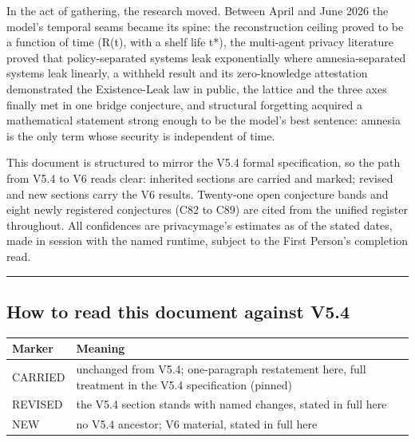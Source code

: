 \documentclass[
]{article}
\newcounter{none} %
\begin{document}
In the act of gathering, the research moved. Between April and June 2026
the model's temporal seams became its spine: the reconstruction ceiling
proved to be a function of time (R(t), with a shelf life t*), the
multi-agent privacy literature proved that policy-separated systems leak
exponentially where amnesia-separated systems leak linearly, a withheld
result and its zero-knowledge attestation demonstrated the
Existence-Leak law in public, the lattice and the three axes finally met
in one bridge conjecture, and structural forgetting acquired a
mathematical statement strong enough to be the model's best sentence:
amnesia is the only term whose security is independent of time.

This document is structured to mirror the V5.4 formal specification, so
the path from V5.4 to V6 reads clear: inherited sections are carried and
marked; revised and new sections carry the V6 results. Twenty-one open
conjecture bands and eight newly registered conjectures (C82 to C89) are
cited from the unified register throughout. All confidences are
privacymage's estimates as of the stated dates, made in session with the
named runtime, subject to the First Person's completion read.

\begin{center}\rule{0.5\linewidth}{0.5pt}\end{center}

\subsection{How to read this document against
V5.4}\label{how-to-read-this-document-against-v5.4}

{\def\LTcaptype{none} %
\begin{longtable}[]{@{}
  >{\raggedright\arraybackslash}p{}
  >{\raggedright\arraybackslash}p{}@{}}
\toprule\noalign{}
\begin{minipage}[b]{\linewidth}\raggedright
Marker
\end{minipage} & \begin{minipage}[b]{\linewidth}\raggedright
Meaning
\end{minipage} \\
\midrule\noalign{}
\endhead
\bottomrule\noalign{}
\endlastfoot
CARRIED & unchanged from V5.4; one-paragraph restatement here, full
treatment in the V5.4 specification (pinned) \\
REVISED & the V5.4 section stands with named changes, stated in full
here \\
NEW & no V5.4 ancestor; V6 material, stated in full here \\
\end{longtable}
}
\end{document}
